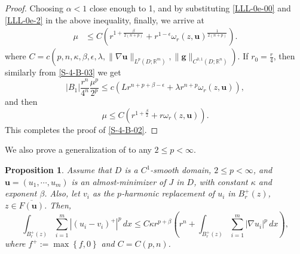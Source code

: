 \documentclass{amsart}
\newtheorem{proposition}[theorem]{Proposition}
\begin{document}
\begin{proof}
Choosing  $\alpha < 1$ close enough to 1, and by substituting \eqref{LLL-0e-00} and \eqref{LLL-0e-2} in the above inequality, finally, we arrive at
$$
\begin{aligned}
\mu 
& \leq C \left(  r^{1+\frac{\beta}{2(n+p)}} + r^{1-\epsilon} \omega_r(z,\mathbf{u})^{\frac{1}{2(n+p)}} \right).
\end{aligned}
$$
where $C=c(p, n, \kappa, \beta, \epsilon,  \lambda, \| \nabla \mathbf{u} \|_{L^p(D; \mathbb{R}^m)}, \| \mathbf{g} \|_{C^{0,1}(D;\mathbb{R}^n)})$.
If $r_0=\frac r4$, then similarly from \eqref{S-4-B-03} we get 
$$ |B_1| \frac{r^n}{4^n} \frac{\mu^p}{2^p} \leq c \left( L  r^{n+p+\beta-\epsilon} + \lambda r^{n+p} \omega_r(z,\mathbf{u}) \right), $$ 
and then
$$
\mu \le C\left(r^{1+\frac\beta 2} + r  \omega_r(z,\mathbf{u})\right).
$$
This completes the proof of \eqref{S-4-B-02}.
\end{proof}



We also prove a generalization of \cite[Lemma 10.1]{MR3385167} to any $2\le p<\infty$.

\begin{proposition}
\label{Lemma10.1}
Assume that $D$ is a %
$C^1$-smooth domain, $2\le p<\infty$, and  $\mathbf{u}=(u_1, \cdots, u_m)$ is  an almost-minimizer of $J$ in $D$, with constant $\kappa$ and exponent $\beta$. Also, let $v_i$ as the $p$-harmonic replacement of $u_i$ in $B_{r}^+(z)$, $z \in \overline{F(\mathbf{u})}$. Then,
\begin{equation}
\label{Eq-Lemma10.1}
\int_{B_{r}^+(z)} \sum_{i=1}^{m} \left| \left(u_i-v_i \right)^+ \right|^p \, dx \leq C \kappa r^{p+\beta} \left( r^n + \int_{B_r^+(z)} \sum_{i=1}^{m} |\nabla u_i|^p \, dx \right),
\end{equation}
where  $f^+:=\max \left\{f,0 \right\}$ and 
$C= C(p, n)$.
\end{proposition}
\end{document}
